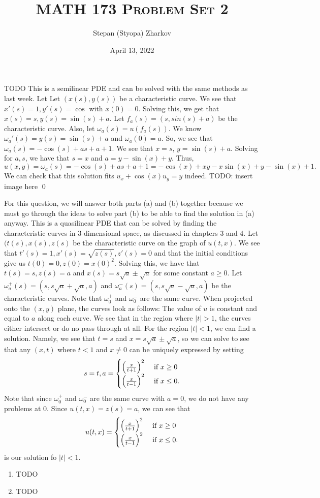 \documentclass{article}
\title{\textsc{MATH 173 Problem Set 2}}
\author{Stepan (Styopa) Zharkov}
\date{April 13, 2022}
\begin{document}
\maketitle
{} TODO
\hop
\solution
This is a semilinear PDE and can be solved with the same methods as last week. Let 
Let $(x(s), y(s))$ be a characteristic curve. We see that $x'(s) = 1, y'(s) = \cos$ with $x(0) = 0$. 
\hop
Solving this, we get that $x(s) = s, y(s) = \sin(s) + a$. Let $f_a(s) = (s, 
sin(s)+a)$ be the characteristic curve. Also, let $\omega_a(s) = u(f_a(s))$.  We know $\omega_a'(s) = y(s) = \sin(s) + a$ and $\omega_a(0) = a$. So, we see that $\omega_a(s) = -\cos(s)+as +a +1$. We see that $x= s$, $y= \sin(s)+a$. Solving for $a, s$, we have that $s =x$ and $a = y - \sin(x) + y$. Thus,
\[u(x,y) = \omega_a(s)=-\cos(s)+as +a +1 = -\cos(x)+xy - x\sin(x)+y-\sin(x)+1.\]
We can check that this solution fits $u_x +\cos(x)u_y = y$ indeed. 
\hop
TODO: insert image here
\qed


\newpage
{} For this question, we will answer both parts (a) and (b) together because we must go through the ideas to solve part (b) to be able to find the solution in (a) anyway. This is a quasilinear PDE that can be solved by finding the characteristic curves in 3-dimensional space, as discussed in chapters 3 and 4. 
\hop 
Let $(t(s), x(s), z(s)$ be the characteristic curve on the graph of $u(t,x)$. We see that $t'(s) = 1, x'(s)=\sqrt{z(s)}, z'(s) = 0$ and that the initial conditions give us $t(0)=0, z(0)= x(0)^2.$ Solving this, we have that $t(s)=s, z(s)=a$ and $x(s) = s\sqrt{a} \pm \sqrt{a}$ for some constant $a\ge0$. Let $\omega^+_a(s) = (s, s\sqrt{a} + \sqrt{a}, a)$ and $\omega^-_a(s) = (s, s\sqrt{a} - \sqrt{a}, a)$ be the characteristic curves. Note that $\omega^+_0$ and $\omega^-_0$ are the same curve. When projected onto the $(x,y)$ plane, the curves look as follows:
\hop %
The value of $u$ is constant and equal to $a$ along each curve. We see that in the region where $|t| > 1$, the curves either intersect or do no pass through at all. For the region $|t| < 1$, we can find a solution. Namely, we see that $t= s$ and $x = s\sqrt{a} \pm \sqrt{a}$, so we can solve to see that any $(x,t)$ where $t < 1$ and $x \ne 0$ can be uniquely expressed by setting 
\[s= t, a = \begin{cases}
    \del{\frac{x}{t+1}}^2 &\text{ if } x\ge  0 \\
    \del{\frac{x}{t-1}}^2 &\text{ if } x\le 0.
\end{cases}\]
Note that since $\omega^+_0$ and $\omega^-_0$ are the same curve with $a=0$, we do not have any problems at 0. Since $u(t,x) = z(s) = a$, we can see that  
\[u(t,x) = \begin{cases}
    \del{\frac{x}{t+1}}^2 &\text{ if } x\ge  0 \\
    \del{\frac{x}{t-1}}^2 &\text{ if } x\le 0.
\end{cases}\]
is our solution fo $|t|<1$. 
\hop
\solution
\begin{enumerate}
    \item TODO
    \item TODO
\end{enumerate}
\end{document}
